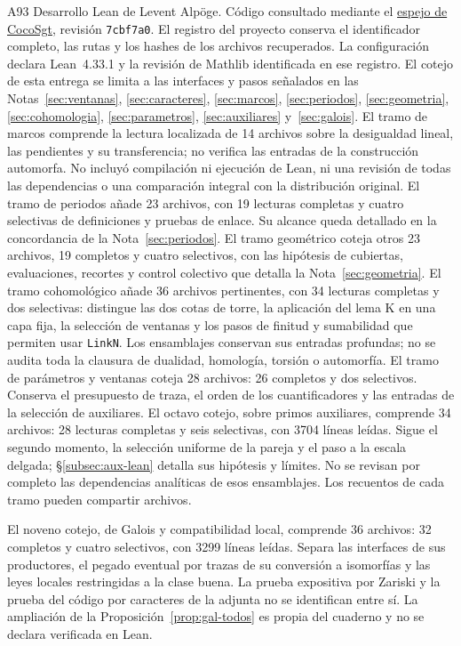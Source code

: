\begin{thebibliography}{A93}
Desarrollo Lean de Levent Alpöge. Código consultado mediante el
\href{https://github.com/CocoSgt/riemann-hypothesis-lean/tree/7cbf7a0c32fca1badf05931879a37c3f8a2b03b4}{espejo de CocoSgt}, revisión \texttt{7cbf7a0}.
El registro del proyecto conserva el identificador completo, las rutas
y los hashes de los archivos recuperados. La configuración declara
Lean~4.33.1 y la revisión de Mathlib identificada en ese registro.
El cotejo de esta entrega se limita a las interfaces y pasos señalados
en las Notas~\ref{sec:ventanas}, \ref{sec:caracteres},
\ref{sec:marcos}, \ref{sec:periodos}, \ref{sec:geometria},
\ref{sec:cohomologia}, \ref{sec:parametros}, \ref{sec:auxiliares}
y~\ref{sec:galois}.
El tramo de marcos comprende la lectura localizada de 14 archivos sobre
la desigualdad lineal, las pendientes y su transferencia; no verifica las
entradas de la construcción automorfa. No incluyó compilación ni ejecución
de Lean, ni una revisión de todas las dependencias o una comparación
integral con la distribución original.
El tramo de periodos añade 23 archivos, con 19 lecturas completas y
cuatro selectivas de definiciones y pruebas de enlace. Su alcance queda
detallado en la concordancia de la Nota~\ref{sec:periodos}.
El tramo geométrico coteja otros 23 archivos, 19 completos y
cuatro selectivos, con las hipótesis de cubiertas, evaluaciones,
recortes y control colectivo que detalla la
Nota~\ref{sec:geometria}. El tramo cohomológico añade 36 archivos
pertinentes, con 34 lecturas completas y dos selectivas: distingue
las dos cotas de torre, la aplicación del lema K en una capa fija,
la selección de ventanas y los pasos de finitud y sumabilidad que
permiten usar \texttt{LinkN}. Los ensamblajes conservan sus entradas
profundas; no se audita toda la clausura de dualidad, homología,
torsión o automorfía. El tramo de parámetros y ventanas coteja 28 archivos:
26 completos y dos selectivos. Conserva el presupuesto de traza,
el orden de los cuantificadores y las entradas de la selección de
auxiliares. El octavo cotejo, sobre primos auxiliares, comprende
34 archivos: 28 lecturas completas y seis selectivas, con 3704 líneas
leídas. Sigue el segundo momento, la selección uniforme de la pareja
y el paso a la escala delgada; §\ref{subsec:aux-lean} detalla sus
hipótesis y límites. No se revisan por completo las dependencias
analíticas de esos ensamblajes. Los recuentos de cada tramo pueden
compartir archivos.

El noveno cotejo, de Galois y compatibilidad local, comprende
36 archivos: 32 completos y cuatro selectivos, con 3299 líneas
leídas. Separa las interfaces de sus productores, el pegado
eventual por trazas de su conversión a isomorfías y las leyes
locales restringidas a la clase buena.
La prueba expositiva por Zariski y la prueba del código por
caracteres de la adjunta no se identifican entre sí.
La ampliación de la Proposición~\ref{prop:gal-todos} es propia
del cuaderno y no se declara verificada en Lean.


\end{thebibliography}
